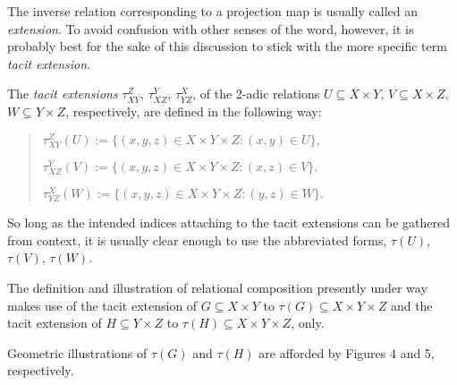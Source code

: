 \documentclass[12pt]{article}
\begin{document}
The inverse relation corresponding to a projection map is usually called an \textit{extension}.  To avoid confusion with other senses of the word, however, it is probably best for the sake of this discussion to stick with the more specific term \textit{tacit extension}.

The \textit{tacit extensions} $\tau_{XY}^Z$, $\tau_{XZ}^Y$, $\tau_{YZ}^X$, of the 2-adic relations $U \subseteq X \times Y$, $V \subseteq X \times Z$, $W \subseteq Y \times Z$, respectively, are defined in the following way:

\begin{quote}
$\tau_{XY}^Z(U) := \{ (x, y, z) \in X \times Y \times Z : (x, y) \in U \},$

$\tau_{XZ}^Y(V) := \{ (x, y, z) \in X \times Y \times Z : (x, z) \in V \},$

$\tau_{YZ}^X(W) := \{ (x, y, z) \in X \times Y \times Z : (y, z) \in W \}.$
\end{quote}

So long as the intended indices attaching to the tacit extensions can be gathered from context, it is usually clear enough to use the abbreviated forms, $\tau(U)$, $\tau(V)$, $\tau(W)$.

The definition and illustration of relational composition presently under way makes use of the tacit extension of $G \subseteq X \times Y$ to $\tau(G) \subseteq X \times Y \times Z$ and the tacit extension of $H \subseteq Y \times Z$ to $\tau(H) \subseteq X \times Y \times Z$, only.

Geometric illustrations of $\tau(G)$ and $\tau(H)$ are afforded by Figures 4 and 5, respectively.
\end{document}
